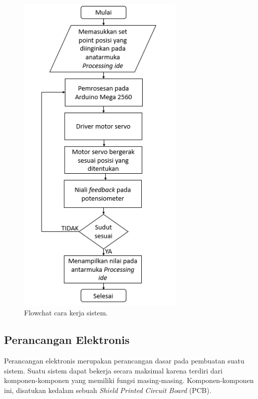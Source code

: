 	\begin{figure}[H]
	\centering
	\includegraphics[width=8cm	]{002.png}
	\caption{Flowchat cara kerja sistem.}
\end{figure}

\subsection{Perancangan Elektronis}
Perancangan elektronis merupakan perancangan dasar pada pembuatan suatu sistem. Suatu sistem dapat bekerja secara maksimal karena terdiri dari komponen-komponen yang memiliki fungsi masing-masing. Komponen-komponen ini, disatukan kedalam sebuah \textit{Shield} \textit{Printed Circuit Board} (PCB). 

